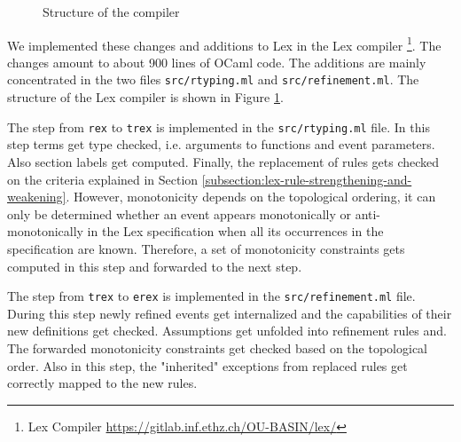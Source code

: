 \begin{figure}
    \caption{Structure of the \Lex{} compiler
    \label{fig:lex-compiler} \cite[Figure 13]{lex}}
\end{figure}

We implemented these changes and additions to Lex in the
Lex compiler
\footnote{Lex Compiler \url{https://gitlab.inf.ethz.ch/OU-BASIN/lex/}}.
The changes amount to about 900 lines of OCaml code.
The additions are mainly concentrated in the two files
\texttt{src/rtyping.ml} and \texttt{src/refinement.ml}.
The structure of the Lex compiler is shown in
Figure \ref{fig:lex-compiler}.

The step from \texttt{rex} to \texttt{trex} is implemented
in the \texttt{src/rtyping.ml} file.
In this step terms get type checked, i.e. arguments
to functions and event parameters.
Also section labels get computed.
Finally, the replacement of rules gets checked
on the criteria explained in Section
\ref{subsection:lex-rule-strengthening-and-weakening}.
However, monotonicity depends on the topological ordering,
it can only be determined whether an event appears
monotonically or anti-monotonically in the
Lex specification when all its occurrences in
the specification are known.
Therefore, a set of monotonicity constraints
gets computed in this step and forwarded to the next
step.

The step from \texttt{trex} to \texttt{erex} is implemented
in the \texttt{src/refinement.ml} file.
During this step newly refined events get internalized
and the capabilities of their new definitions get
checked.
Assumptions get unfolded into refinement rules and.
The forwarded monotonicity constraints get checked
based on the topological order.
Also in this step, the "inherited" exceptions from
replaced rules get correctly mapped to the new rules.


